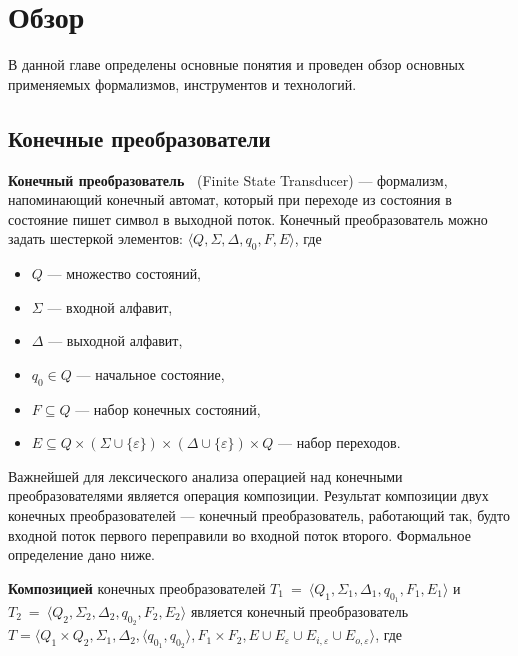 \section{Обзор}
В данной главе определены основные понятия и проведен обзор основных применяемых формализмов, инструментов и технологий.

\subsection{Конечные преобразователи}
\textbf{Конечный преобразователь~\cite{FST}} (Finite State Transducer) --- формализм, напоминающий конечный автомат, который при переходе из состояния в состояние пишет символ в выходной поток.
Конечный преобразователь можно задать шестеркой элементов: 
$\langle Q, \Sigma, \Delta, q_0, F, E \rangle$, где

\begin{itemize}
\item $Q$ --- множество состояний, 
\item $\Sigma$ --- входной алфавит, 
\item $\Delta$ --- выходной алфавит, 
\item $q_0 \in Q$ --- начальное состояние, 
\item $F \subseteq Q$ --- набор конечных состояний, 
\item $E \subseteq Q \times (\Sigma \cup \{\varepsilon\}) \times (\Delta \cup \{\varepsilon\})  \times Q$ --- набор переходов. 
\end{itemize}

Важнейшей для лексического анализа операцией над конечными преобразователями является операция композиции. Результат композиции двух конечных преобразователей — конечный преобразователь, работающий так, будто входной поток первого переправили во входной поток второго. Формальное определение дано ниже.

\textbf{Композицией} конечных преобразователей 
$T_1~=~\langle Q_1, \Sigma_1, \Delta_1, q_{0_{1}}, F_1, E_1 \rangle$ и $T_2~=~\langle Q_2, \Sigma_2, \Delta_2, q_{0_{2}}, F_2, E_2 \rangle$ является конечный преобразователь  $T =\langle Q_1  \times Q_2, \Sigma_1, \Delta_2, \langle q_{0_{1}}, q_{0_{2}} \rangle, F_1 \times F_2, E \cup E_{\varepsilon} \cup E_{i,\varepsilon} \cup E_{o,\varepsilon} \rangle$, где 

